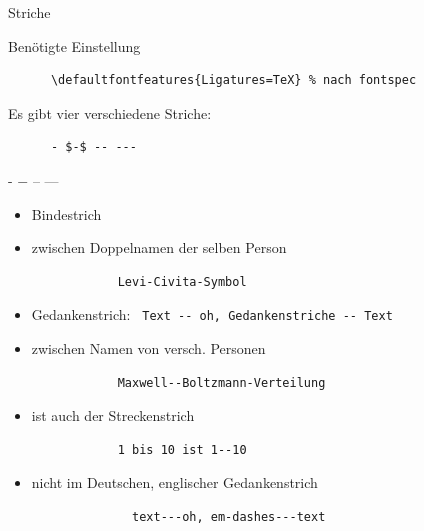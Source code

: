 \begin{frame}[fragile]{Striche}
  \begin{block}{Benötigte Einstellung}
    \begin{lstlisting}
      \defaultfontfeatures{Ligatures=TeX} % nach fontspec
    \end{lstlisting}
  \end{block}
  Es gibt vier verschiedene Striche:
  \begin{CodeExample}{0.49}
    \begin{lstlisting}
      - $-$ -- ---
    \end{lstlisting}
  \CodeResult
    - $-$ -- ---
  \end{CodeExample}

  \begin{description}
    \item[- Bindestrich]
      \begin{itemize}
        \item Bindestrich
        \item zwischen Doppelnamen der selben Person
          \begin{lstlisting}
            Levi-Civita-Symbol
          \end{lstlisting}
      \end{itemize}
    \item[-- Halbgeviertstrich (en-dash)]
      \begin{itemize}
        \item Gedankenstrich: \lstinline+ Text -- oh, Gedankenstriche -- Text +
        \item zwischen Namen von versch. Personen
          \begin{lstlisting}
            Maxwell--Boltzmann-Verteilung
          \end{lstlisting}
        \item ist auch der Streckenstrich
          \begin{lstlisting}
            1 bis 10 ist 1--10
          \end{lstlisting}
      \end{itemize}
    \item[--- Geviertstrich (em-dash)]
      \begin{itemize}
          \item nicht im Deutschen, englischer Gedankenstrich
            \begin{lstlisting}
              text---oh, em-dashes---text
            \end{lstlisting}
      \end{itemize}
  \end{description}
\end{frame}

